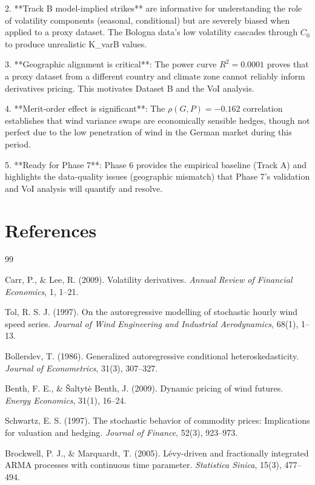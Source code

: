 \documentclass[11pt, a4paper, twoside]{article}
\begin{document}
2. **Track B model-implied strikes** are informative for understanding the role of volatility components (seasonal, conditional) but are severely biased when applied to a proxy dataset. The Bologna data's low volatility cascades through $C_0$ to produce unrealistic K\_varB values.

3. **Geographic alignment is critical**: The power curve $R^2 = 0.0001$ proves that a proxy dataset from a different country and climate zone cannot reliably inform derivatives pricing. This motivates Dataset B and the VoI analysis.

4. **Merit-order effect is significant**: The $\rho(G,P) = -0.162$ correlation establishes that wind variance swaps are economically sensible hedges, though not perfect due to the low penetration of wind in the German market during this period.

5. **Ready for Phase 7**: Phase 6 provides the empirical baseline (Track A) and highlights the data-quality issues (geographic mismatch) that Phase 7's validation and VoI analysis will quantify and resolve.

\section*{References}

\begin{thebibliography}{99}

Carr, P., \& Lee, R. (2009). Volatility derivatives. \textit{Annual Review of Financial Economics}, 1, 1--21.

Tol, R. S. J. (1997). On the autoregressive modelling of stochastic hourly wind speed series. \textit{Journal of Wind Engineering and Industrial Aerodynamics}, 68(1), 1--13.

Bollerslev, T. (1986). Generalized autoregressive conditional heteroskedasticity. \textit{Journal of Econometrics}, 31(3), 307--327.

Benth, F. E., \& Šaltytė Benth, J. (2009). Dynamic pricing of wind futures. \textit{Energy Economics}, 31(1), 16--24.

Schwartz, E. S. (1997). The stochastic behavior of commodity prices: Implications for valuation and hedging. \textit{Journal of Finance}, 52(3), 923--973.

Brockwell, P. J., \& Marquardt, T. (2005). Lévy-driven and fractionally integrated ARMA processes with continuous time parameter. \textit{Statistica Sinica}, 15(3), 477--494.

\end{thebibliography}
\end{document}
